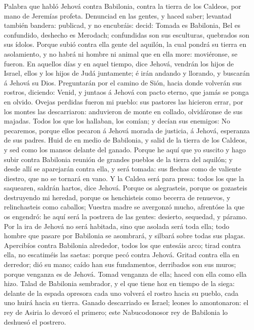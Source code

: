  Palabra que habló Jehová contra Babilonia, contra la tierra
de los Caldeos, por mano de Jeremías profeta.  Denunciad en
las gentes, y haced saber; levantad también bandera: publicad, y no
encubráis: decid: Tomada es Babilonia, Bel es confundido, deshecho es
Merodach; confundidas son sus esculturas, quebrados son sus ídolos.
 Porque subió contra ella gente del aquilón, la cual pondrá
su tierra en asolamiento, y no habrá ni hombre ni animal que en ella
more: moviéronse, se fueron.  En aquellos días y en aquel
tiempo, dice Jehová, vendrán los hijos de Israel, ellos y los hijos de
Judá juntamente; é irán andando y llorando, y buscarán á Jehová su Dios.
 Preguntarán por el camino de Sión, hacia donde volverán sus
rostros, diciendo: Venid, y juntaos á Jehová con pacto eterno, que jamás
se ponga en olvido.  Ovejas perdidas fueron mi pueblo: sus
pastores las hicieron errar, por los montes las descarriaron: anduvieron
de monte en collado, olvidáronse de sus majadas.  Todos los
que los hallaban, los comían; y decían sus enemigos: No pecaremos,
porque ellos pecaron á Jehová morada de justicia, á Jehová, esperanza de
sus padres.  Huid de en medio de Babilonia, y salid de la
tierra de los Caldeos, y sed como los mansos delante del ganado.
 Porque he aquí que yo suscito y hago subir contra Babilonia
reunión de grandes pueblos de la tierra del aquilón; y desde allí se
aparejarán contra ella, y será tomada: sus flechas como de valiente
diestro, que no se tornará en vano.  Y la Caldea será para
presa: todos los que la saquearen, saldrán hartos, dice Jehová.
 Porque os alegrasteis, porque os gozasteis destruyendo mi
heredad, porque os henchisteis como becerra de renuevos, y relinchasteis
como caballos;  Vuestra madre se avergonzó mucho, afrentóse
la que os engendró: he aquí será la postrera de las gentes: desierto,
sequedad, y páramo.  Por la ira de Jehová no será habitada,
sino que asolada será toda ella; todo hombre que pasare por Babilonia se
asombrará, y silbará sobre todas sus plagas.  Apercibíos
contra Babilonia alrededor, todos los que entesáis arco; tirad contra
ella, no escatiméis las saetas: porque pecó contra Jehová. 
Gritad contra ella en derredor; dió su mano; caído han sus fundamentos,
derribados son sus muros; porque venganza es de Jehová. Tomad venganza
de ella; haced con ella como ella hizo.  Talad de Babilonia
sembrador, y el que tiene hoz en tiempo de la siega: delante de la
espada opresora cada uno volverá el rostro hacia su pueblo, cada uno
huirá hacia su tierra.  Ganado descarriado es Israel;
leones lo amontonaron: el rey de Asiria lo devoró el primero; este
Nabucodonosor rey de Babilonia lo deshuesó el postrero.

